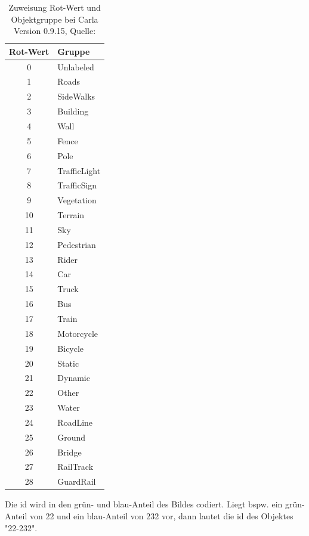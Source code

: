 \begin{table}[h]
	\begin{center}
		{\small %
			\begin{tabular}{c l}
				\toprule
				\textbf{Rot-Wert} & \textbf{Gruppe} \\
				\midrule
				0  & Unlabeled \\
				1  & Roads \\
				2  & SideWalks \\
				3  & Building \\
				4  & Wall \\
				5  & Fence \\
				6  & Pole \\
				7  & TrafficLight \\
				8  & TrafficSign \\
				9  & Vegetation \\
				10 & Terrain \\
				11 & Sky \\
				12 & Pedestrian \\
				13 & Rider \\
				14 & Car \\
				15 & Truck \\
				16 & Bus \\
				17 & Train \\
				18 & Motorcycle \\
				19 & Bicycle \\
				20 & Static \\
				21 & Dynamic \\
				22 & Other \\
				23 & Water \\
				24 & RoadLine \\
				25 & Ground \\
				26 & Bridge \\
				27 & RailTrack \\
				28 & GuardRail \\
				\bottomrule
			\end{tabular}
		}%
	\end{center}
	\caption{Zuweisung Rot-Wert und Objektgruppe bei Carla Version 0.9.15, Quelle: \cite{lit_website_carla_documentation}}\label{tab:rot_tag}
	
\end{table}



Die \acrshort{id} wird in den grün- und blau-Anteil des Bildes codiert. Liegt bspw. ein grün-Anteil von 22 und ein blau-Anteil von 232 vor, dann lautet die \acrshort{id} des Objektes "22-232".

